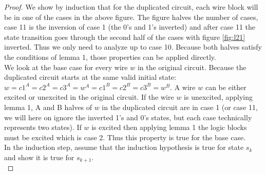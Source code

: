 \documentclass[12pt]{report}
\begin{document}
\begin{proof}
We show by induction that for the duplicated circuit, each wire block will be in one of the cases in the above figure.  The figure halves the number of cases, case 11 is the inversion of case 1 (the 0's and 1's inverted) and after case 11 the state transition goes through the second half of the cases with figure \ref{fig:l21} inverted.  Thus we only need to analyze up to case 10.  Because both halves satisfy the conditions of lemma 1, those properties can be applied directly.\\

We look at the base case for every wire $w$ in the original circuit.  Because the duplicated circuit starts at the same valid initial state: $w=c1^A=c2^A=c3^A=w^A=c1^B=c2^B=c3^B=w^B$.  A wire $w$ can be either excited or unexcited in the original circuit. If the wire $w$ is unexcited, applying lemma 1,  A and B halves of $w$ in the duplicated circuit are in case 1 (or case 11, we will here on ignore the inverted 1's and 0's states, but each case technically represents two states).  If $w$ is excited then applying lemma 1 the logic blocks must be excited which is case 2.  Thus this property is true for the base case. \\

In the induction step, assume that the induction hypothesis is true for state $s_k$ and show it is true for $s_{k+1}$.  \\


\end{proof}
\end{document}
